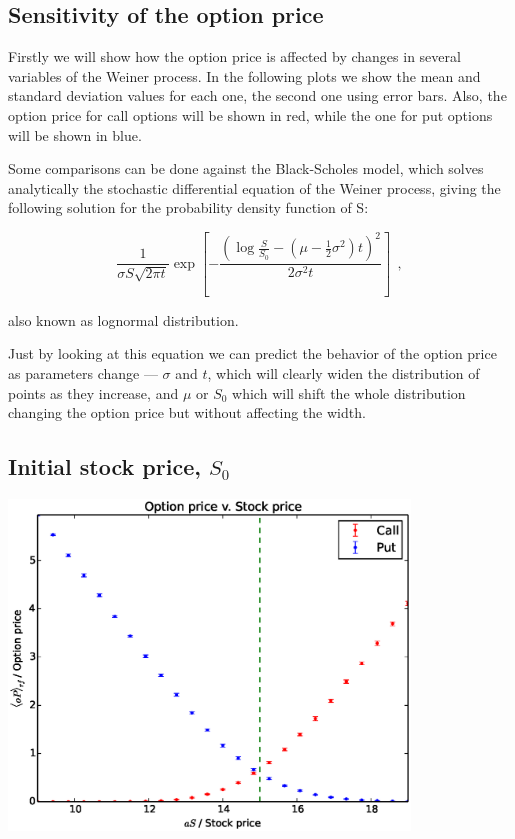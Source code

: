 \documentclass[8 pt]{article}
\newenvironment{Figure}
  {\par\medskip\noindent\minipage{\linewidth}}
  {\endminipage\par\medskip}
\begin{document}
\begin{multicols*}{2}
\section{Sensitivity of the option price}

Firstly we will show how the option price is affected by changes in several variables of the Weiner process. In the following plots we show the mean and standard deviation values for each one, the second one using error bars. Also, the option price for call options will be shown in red, while the one for put options will be shown in blue.

Some comparisons can be done against the Black-Scholes model, which solves analytically the stochastic differential equation of the Weiner process, giving the following solution \cite{Wilmott} for the probability density function of S:

\begin{equation} \label{eq:weinersol}
  \frac{1}{\sigma S \sqrt{2\pi t}} \exp\left[ -\frac{\left(\log\frac{S}{S_0} - (\mu - \frac{1}{2}\sigma^2)t\right)^2}{2\sigma^2 t}\right] ~~,
\end{equation}

also known as lognormal distribution.

Just by looking at this equation we can predict the behavior of the option price as parameters change --- $\sigma$ and $t$, which will clearly widen the distribution of points as they increase, and $\mu$ or $S_0$ which will shift the whole distribution changing the option price but without affecting the width.

\subsection{Initial stock price, $S_0$}

\begin{Figure}
  \begin{center}
    \includegraphics[width=0.8\textwidth]{graphs/oP_stock.eps}
    \label{fig:stock_sens}
  \end{center}
\end{Figure}


\end{multicols*}
\end{document}
